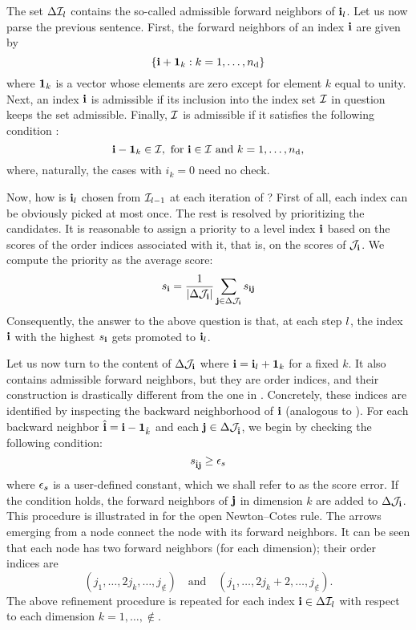 The set $\Delta\mathcal{I}_l$ contains the so-called admissible forward neighbors
of $\mathbf{i}_l$. Let us now parse the previous sentence. First, the forward
neighbors of an index $\mathbf{i}$ are given by
\begin{equation} \elab{forward-level-neighbors}
  \left\{ \vi + \v{1}_k: k = 1, \dots, \nin \right\}
\end{equation}
where $\mathbf{1}_k$ is a vector whose elements are zero except for element $k$ equal
to unity. Next, an index $\mathbf{i}$ is admissible if its inclusion into the index set
$\mathcal{I}$ in question keeps the set admissible. Finally, $\mathcal{I}$ is admissible
if it satisfies the following condition \cite{klimke2006}:
\begin{equation} \elab{admissibility}
  \vi - \v{1}_k \in \lindex, \text{ for $\vi \in \lindex$ and $k = 1, \dots, \nin$,}
\end{equation}
where, naturally, the cases with $i_k = 0$ need no check.

Now, how is $\mathbf{i}_l$ chosen from $\mathcal{I}_{l-1}$ at each iteration of
? First of all, each index can be obviously picked at most
once. The rest is resolved by prioritizing the candidates. It is reasonable to
assign a priority to a level index $\mathbf{i}$ based on the scores of the order
indices associated with it, that is, on the scores of $\mathcal{J}_{\mathbf{i}}$. We compute
the priority as the average score:
\[
  s_{\mathbf{i}} = \frac{1}{\left| \Delta\mathcal{J}_{\mathbf{i}} \right|} \sum_{\mathbf{j} \in \Delta\mathcal{J}_{\mathbf{i}}} s_{\mathbf{i}\mathbf{j}}
\]
Consequently, the answer to the above question is that, at each step $l$, the
index $\mathbf{i}$ with the highest $s_{\mathbf{i}}$ gets promoted to $\mathbf{i}_l$.

Let us now turn to the content of $\Delta\mathcal{J}_{\mathbf{i}}$ where $\mathbf{i} = \mathbf{i}_l +
\mathbf{1}_k$ for a fixed $k$. It also contains admissible forward neighbors, but
they are order indices, and their construction is drastically different from the
one in . Concretely, these indices are identified
by inspecting the backward neighborhood of $\mathbf{i}$ (analogous to
). For each backward neighbor $\hat{\mathbf{i}} = \mathbf{i} -
\mathbf{1}_{\hat{k}}$ and each $\mathbf{j} \in \Delta\mathcal{J}_{\hat{\mathbf{i}}}$, we begin by
checking the following condition:
\[
  s_{\hat{\mathbf{i}}\mathbf{j}} \geq \epsilon_s
\]
where $\epsilon_s$ is a user-defined constant, which we shall refer to as the score
error. If the condition holds, the forward neighbors of $\mathbf{j}$ in dimension $k$
are added to $\Delta\mathcal{J}_{\mathbf{i}}$. This procedure is illustrated in 
for the open Newton--Cotes rule. The arrows emerging from a node connect the
node with its forward neighbors. It can be seen that each node has two forward
neighbors (for each dimension); their order indices are
\[
  (j_1, \dots, 2 j_k, \dots, j_\nin) \hspace{1em} \text{and} \hspace{1em} (j_1, \dots, 2 j_k + 2, \dots, j_\nin).
\]
The above refinement procedure is repeated for each index $\mathbf{i} \in
\Delta\mathcal{I}_l$ with respect to each dimension $k = 1, \dots, \nin$.

